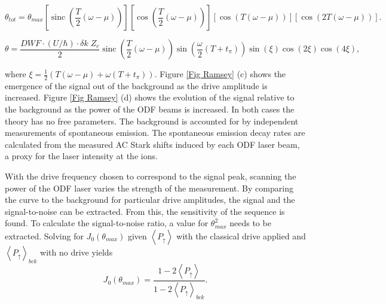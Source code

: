 \documentclass[aps,prl,twocolumn,superscriptaddress,floatfix]{revtex4-1}
\DeclareMathOperator{\sinc}{sinc}
\begin{document}
\begin{widetext}
\begin{equation}
\theta_{tot} = \theta_{max} \left[ \sinc \left( \frac{T}{2} \left( \omega-\mu \right) \right) \right] 
\left[ \cos \left( \frac{T}{2} \left( \omega - \mu \right) \right) \right] \left[ \cos(T(\omega - \mu)) \right] \left[ \cos(2T(\omega - \mu)) \right] .
\end{equation}
\end{widetext}

\begin{widetext}
\begin{equation}
\theta = \frac{DWF \cdot (U/\hbar) \cdot \delta k\;Z_c}{2}  \sinc\left( \frac{T}{2} \left( \omega-\mu \right) \right) \sin\left( \frac{\omega}{2} \left( T+t_{\pi} \right) \right) \sin(\xi)\cos(2 \xi)\cos(4 \xi),
\end{equation}
\end{widetext}

where $\xi = \frac{1}{2}\left( T(\omega - \mu) + \omega(T+t_{\pi}) \right)$. Figure \ref{Fig Ramsey} (c) shows the emergence of the signal out of the background as the drive amplitude is increased. Figure \ref{Fig Ramsey} (d) shows the evolution of the signal relative to the background as the power of the ODF beams is increased. In both cases the theory has no free parameters. The background is accounted for by independent measurements of spontaneous emission. The spontaneous emission decay rates are calculated from the measured AC Stark shifts induced by each ODF laser beam, a proxy for the laser intensity at the ions.

With the drive frequency chosen to correspond to the signal peak, scanning the power of the ODF laser varies the strength of the measurement. By comparing the curve to the background for particular drive amplitudes, the signal and the signal-to-noise can be extracted. From this, the sensitivity of the sequence is found. To calculate the signal-to-noise ratio, a value for $\theta^{2}_{max}$ needs to be extracted. Solving for $J_0(\theta_{max})$ given $\left< P_{\uparrow} \right>$ with the classical drive applied and $\left< P_{\uparrow} \right>_{bck}$ with no drive yields
\begin{equation}
J_0(\theta_{max}) = \frac{1-2\left< P_{\uparrow} \right>}{1-2\left< P_{\uparrow} \right>_{bck}}.
\end{equation}
\end{document}
